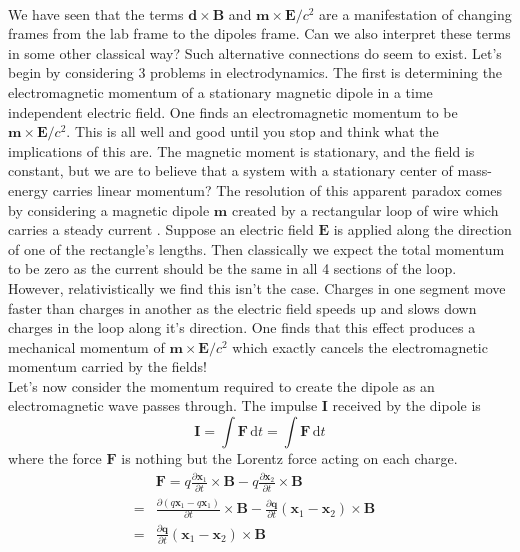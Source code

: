 \documentclass[twocolumn,english,pra,aps,superscriptaddress,floatfix]{revtex4-1}
\begin{document}
\\
We have seen that the terms $\mathbf{d}\times\mathbf{B}$ and $\mathbf{m}\times\mathbf{E}/c^2$ are a manifestation of changing frames from the lab frame to the dipoles frame. Can we also interpret these terms in some other classical way?  Such alternative connections do seem to exist. Let's begin by considering 3 problems in electrodynamics.  The first is determining the electromagnetic momentum of a stationary magnetic dipole in a time independent electric field. One finds an electromagnetic momentum to be \cite{Babson09} $\mathbf{m}\times\mathbf{E}/c^2$.  This is all well and good until you stop and think what the implications of this are.  The magnetic moment is stationary, and the field is constant, but we are to believe that a system with a stationary center of mass-energy carries linear momentum?  The resolution of this apparent paradox comes by considering a magnetic dipole $\mathbf{m}$ created by a rectangular loop of wire which carries a steady current \cite{griffiths}.  Suppose an electric field $\mathbf{E}$ is applied along the direction of one of the rectangle's lengths.  Then classically we expect the total momentum to be zero as the current should be the same in all 4 sections of the loop.  However, relativistically we find this isn't the case.  Charges in one segment move faster than charges in another as the electric field speeds up and slows down charges in the loop along it's direction.  One finds that this effect produces a mechanical momentum of \cite{griffiths} $\mathbf{m}\times\mathbf{E}/c^2$ which exactly cancels the electromagnetic momentum carried by the fields!  
\\
Let's now consider the momentum required to create the dipole as an electromagnetic wave passes through.  The impulse $\mathbf{I}$ received by the dipole is
\begin{equation}
\mathbf{I}= \int \! \mathbf{F} \, \mathrm{d}t = \int \! \mathbf{F} \, \mathrm{d}t
\label{Impulse1}
\end{equation}
where the force $\mathbf{F}$ is nothing but the Lorentz force acting on each charge.  
\begin{eqnarray}
&\mathbf{F}= q\frac{\partial\mathbf{x}_1}{\partial t}\times\mathbf{B} - q\frac{\partial\mathbf{x}_2}{\partial t}\times\mathbf{B}& \nonumber \\
= &\frac{\partial \left(q\mathbf{x}_1-q\mathbf{x}_1\right)}{\partial t}\times\mathbf{B} - \frac{\partial\mathbf{q}}{\partial t}\left(\mathbf{x}_1-\mathbf{x}_2\right)\times\mathbf{B}& \nonumber \\
=&\frac{\partial\mathbf{q}}{\partial t}\left(\mathbf{x}_1-\mathbf{x}_2\right)\times\mathbf{B}&
\label{Impulse2}
\end{eqnarray}
\end{document}
